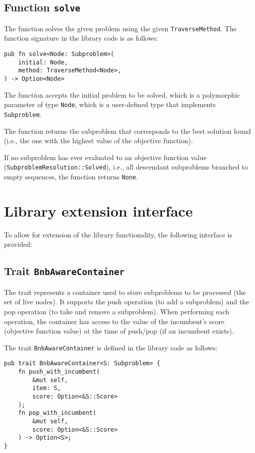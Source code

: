 \subsection{Function \texttt{solve}}

The function solves the given problem using the given \texttt{TraverseMethod}.
The function signature in the library code is as follows:

\begin{lstlisting}[caption=Function \texttt{Solve}]
pub fn solve<Node: Subproblem>(
    initial: Node,
    method: TraverseMethod<Node>,
) -> Option<Node>
\end{lstlisting}

The function accepts the initial problem to be solved, which is a polymorphic
parameter of type \texttt{Node}, which is a user-defined type that implements
\texttt{Subproblem}.

The function returns the subproblem that corresponds to the best solution found
(i.e., the one with the highest value of the objective function).

If no subproblem has ever evaluated to an objective function value
(\texttt{SubproblemResolution::Solved}), i.e., all descendant subproblems branched to empty
sequences, the function returns \texttt{None}.

\section{Library extension interface}

\label{sec:lib_extension_interface}

To allow for extension of the library functionality, the following interface is provided:

\subsection{Trait \texttt{BnbAwareContainer}}

The trait represents a container used to store subproblems to be processed
(the set of live nodes). It supports the push operation (to add a subproblem)
and the pop operation (to take and remove a subproblem).
When performing each operation, the container has access to the value of the incumbent's
score (objective function value) at the time of push/pop (if an incumbent exists).

The trait \texttt{BnbAwareContainer} is defined in the library code as follows:

\begin{lstlisting}[caption=Trait \texttt{BnbAwareContainer}]
pub trait BnbAwareContainer<S: Subproblem> {
    fn push_with_incumbent(
        &mut self,
        item: S,
        score: Option<&S::Score>
    );
    fn pop_with_incumbent(
        &mut self,
        score: Option<&S::Score>
    ) -> Option<S>;
}
\end{lstlisting}

